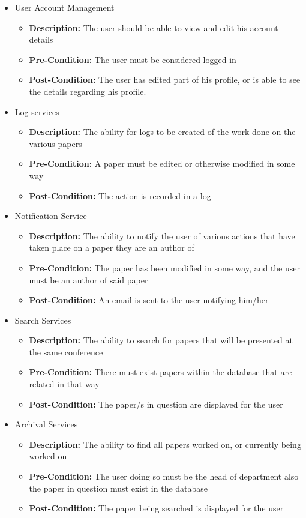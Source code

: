 \documentclass[11pt]{article}
\begin{document}
\begin{itemize}
		\item User Account Management
		\begin{itemize}
			\item \textbf{Description: }The user should be able to view and edit his account details
			\item \textbf{Pre-Condition: }The user must be considered logged in
			\item \textbf{Post-Condition: }The user has edited part of his profile, or is able to see the details regarding his profile.
		\end{itemize}
		
		\item Log services
		\begin{itemize}
			\item \textbf{Description: }The ability for logs to be created of the work done on the various papers
			\item \textbf{Pre-Condition: }A paper must be edited or otherwise modified in some way
			\item \textbf{Post-Condition: }The action is recorded in a log
		\end{itemize}
		
		\item Notification Service
		\begin{itemize}
			\item \textbf{Description: }The ability to notify the user of various actions that have taken place on a paper they are an author of
			\item \textbf{Pre-Condition: }The paper has been modified in some way, and the user must be an author of said paper
			\item \textbf{Post-Condition: }An email is sent to the user notifying him/her
		\end{itemize}
		
		\item Search Services
		\begin{itemize}
			\item \textbf{Description: }The ability to search for papers that will be presented at the same conference
			\item \textbf{Pre-Condition: }There must exist papers within the database that are related in that way
			\item \textbf{Post-Condition: }The paper/s in question are displayed for the user
		\end{itemize}
		
		\item Archival Services
		\begin{itemize}
			\item \textbf{Description: }The ability to find all papers worked on, or currently being worked on
			\item \textbf{Pre-Condition: }The user doing so must be the head of department also the paper in question must exist in the database
			\item \textbf{Post-Condition: }The paper being searched is displayed for the user
		\end{itemize}
	\end{itemize}
	
\end{document}

